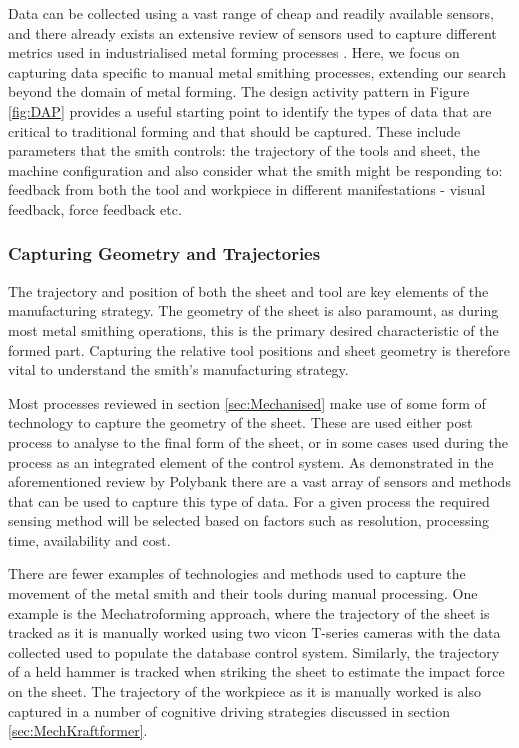 Data can be collected using a vast range of cheap and readily available sensors, and there already exists an extensive review of sensors used to capture different metrics used in industrialised metal forming processes \citep{Allwood2016Closed-loopForming}. Here, we focus on capturing data specific to manual metal smithing processes, extending our search beyond the domain of metal forming. The design activity pattern in Figure \ref{fig:DAP} provides a useful starting point to identify the types of data that are critical to traditional forming and that should be captured. These include parameters that the smith controls: the trajectory of the tools and sheet, the machine configuration and also consider what the smith might be responding to: feedback from both the tool and workpiece in different manifestations - visual feedback, force feedback etc. 

\subsubsection{Capturing Geometry and Trajectories}
The trajectory and position of both the sheet and tool are key elements of the manufacturing strategy. The geometry of the sheet is also paramount, as during most metal smithing operations, this is the primary desired characteristic of the formed part. Capturing the relative tool positions and sheet geometry is therefore vital to understand the smith’s manufacturing strategy.

Most processes reviewed in section \ref{sec:Mechanised} make use of some form of technology to capture the geometry of the sheet. These are used either post process to analyse to the final form of the sheet, or in some cases used during the process as an integrated element of the control system. As demonstrated in the aforementioned review by Polybank \citep{Allwood2016Closed-loopForming} there are a vast array of sensors and methods that can be used to capture this type of data. For a given process the required sensing method will be selected based on factors such as resolution, processing time, availability and cost. 

There are fewer examples of technologies and methods used to capture the movement of the metal smith and their tools during manual processing. One example is the Mechatroforming approach, where the trajectory of the sheet is tracked as it is manually worked  \citep{Ilangovan2016AnForming} using two vicon T-series cameras with the data collected used to populate the database control system. Similarly, the trajectory of a held hammer is tracked when striking the sheet to estimate the impact force on the sheet. The trajectory of the workpiece as it is manually worked is also captured in a number of cognitive driving strategies discussed in section \ref{sec:MechKraftformer}. 

